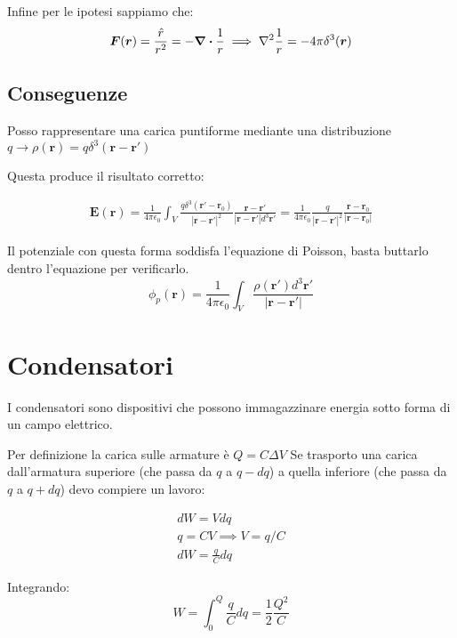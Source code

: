 \documentclass[a4paper]{scrarticle}
\begin{document}
Infine per le ipotesi sappiamo che:
\begin{equation*}
    \bm F (\bm r) = \frac{\hat r}{r^2} = - \div \frac{1}{r} \implies \laplacian \frac{1}{r} = - 4 \pi \delta ^3 (\bm r)
\end{equation*}

\subsection{Conseguenze}

Posso rappresentare una carica puntiforme mediante una distribuzione $q \to \rho(\bm r) = q\delta^3(\bm r - \bm r')$

Questa produce il risultato corretto:

\begin{gather*}
    \bm E (\bm r) = \frac{1}{4\pi\epsilon_0}\int_{V} \frac{q \delta^3 (\bm r' - \bm r_0)}{\left|\bm r - \bm r'\right|^2}\frac{\bm r - \bm r'}{\left| \bm r - \bm r '\right| d^3 \bm r'} = \frac{1}{4 \pi \epsilon_0} \frac{q}{\left|\bm r - \bm r'\right|^2} \frac{\bm r - \bm r_0}{\left|\bm r - \bm r_0\right|}
\end{gather*}

Il potenziale con questa forma soddisfa l'equazione di Poisson, basta buttarlo dentro l'equazione per verificarlo.
\begin{equation}
    \phi_p(\bm r) = \frac{1}{4\pi\epsilon_0}\int_{V}\frac{\rho(\bm r') d^3\bm r'}{\left|\bm r - \bm r'\right|}
\end{equation}

\section{Condensatori}

I condensatori sono dispositivi che possono immagazzinare energia sotto forma di un campo elettrico.

Per definizione la carica sulle armature è $Q = C \Delta V $
Se trasporto una carica dall'armatura superiore (che passa da $q$ a $q - dq$) a quella inferiore (che passa da $q$ a $q + dq$) devo compiere un lavoro:

\begin{gather*}
    dW = V dq\\
    q = CV\implies V = q/C \\
    dW = \frac{q}{C} dq    
\end{gather*}

Integrando:
\begin{equation}
    W = \int_{0}^{Q} \frac{q}{C} dq = \frac{1}{2}\frac{Q^2}{C}
\end{equation}
\end{document}
